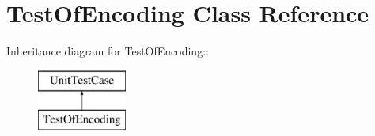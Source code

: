 \hypertarget{class_test_of_encoding}{
\section{TestOfEncoding Class Reference}
\label{class_test_of_encoding}
}
Inheritance diagram for TestOfEncoding::\begin{figure}[H]
\begin{center}
\leavevmode
\includegraphics[height=2cm]{class_test_of_encoding}
\end{center}
\end{figure}
